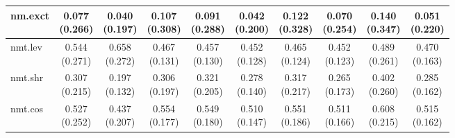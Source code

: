 \documentclass[epsfig,a4paper,11pt,titlepage,twoside,openany]{book}
\begin{document}
\begin{table}[h]
\begin{tabular}{l|c|c|c|c|c|c|c|c|c|}
\multicolumn{1}{|l|}{nm.exct}                          & \makecell{0.077 \\ (0.266)}  & \makecell{0.040 \\ (0.197)} & \makecell{0.107 \\ (0.308)} & \makecell{0.091 \\ (0.288)} & \makecell{0.042 \\ (0.200)} & \makecell{0.122 \\ (0.328)} & \makecell{0.070 \\ (0.254)} & \makecell{0.140 \\ (0.347)}    & \makecell{0.051 \\ (0.220)}   \\ \hline
\multicolumn{1}{|l|}{nmt.lev}            & \makecell{0.544 \\ (0.271)}  & \makecell{0.658 \\ (0.272)} & \makecell{0.467 \\ (0.131)} & \makecell{0.457 \\ (0.130)} & \makecell{0.452 \\ (0.128)} & \makecell{0.465 \\ (0.124)} & \makecell{0.452 \\ (0.123)} & \makecell{0.489 \\ (0.261)}    & \makecell{0.470 \\ (0.163)}   \\ \hline
\multicolumn{1}{|l|}{nmt.shr}                 & \makecell{0.307 \\ (0.215)}  & \makecell{0.197 \\ (0.132)} & \makecell{0.306 \\ (0.197)} & \makecell{0.321 \\ (0.205)} & \makecell{0.278 \\ (0.140)} & \makecell{0.317 \\ (0.217)} & \makecell{0.265 \\ (0.173)} & \makecell{0.402 \\ (0.260)}    & \makecell{0.285 \\ (0.162)}   \\ \hline
\multicolumn{1}{|l|}{nmt.cos} & \makecell{0.527 \\ (0.252)}  & \makecell{0.437 \\ (0.207)} & \makecell{0.554 \\ (0.177)} & \makecell{0.549 \\ (0.180)} & \makecell{0.510 \\ (0.147)} & \makecell{0.551 \\ (0.186)} & \makecell{0.511 \\ (0.166)} & \makecell{0.608 \\ (0.215)}    & \makecell{0.515 \\ (0.162)}   \\ \hline

\end{tabular}
\end{table}
\end{document}
